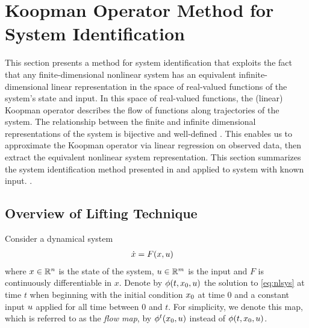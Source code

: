 \section{Koopman Operator Method for \\ System Identification}
\label{sec:theory}

This section presents a method for system identification that exploits the fact that any finite-dimensional nonlinear system has an equivalent infinite-dimensional linear representation in the space of real-valued functions of the system's state and input.
In this space of real-valued functions, the (linear) Koopman operator describes the flow of functions along trajectories of the system.
The relationship between the finite and infinite dimensional representations of the system is bijective and well-defined \cite[]{lasota2013chaos}.
This enables us to approximate the Koopman operator via linear regression on observed data, then extract the equivalent nonlinear system representation.
This section summarizes the system identification method presented in \cite{mauroy2016linear} and \cite{mauroy2017koopman} applied to system with known input. .


\subsection{Overview of Lifting Technique}


Consider a dynamical system
\begin{align}
    \dot{x} &= F(x,u)    \label{eq:nlsys}
\end{align}
where $x \in \mathbb{R}^n$ is the state of the system, $u \in \mathbb{R}^m$ is the input and ${F}$ is continuously differentiable in $x$.
Denote by $\phi(t,x_0,u)$ the solution to \eqref{eq:nlsys} at time $t$ when beginning with the initial condition $x_0$ at time $0$ and a constant input $u$ applied for all time between $0$ and $t$.
For simplicity, we denote this map, which is referred to as the \emph{flow map}, by $\phi^t (x_0, u)$ instead of $\phi (t, x_0, u)$.

